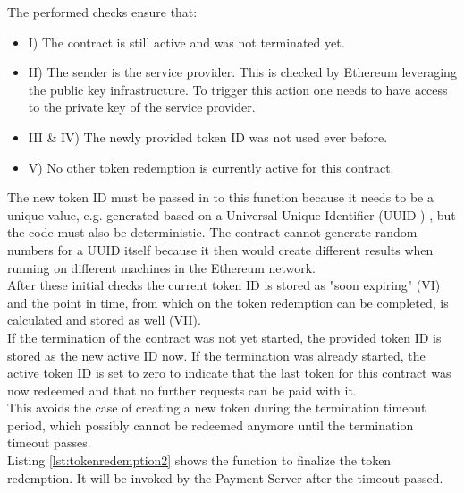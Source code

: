 \documentclass[a4paper,12pt]{scrartcl}
\begin{document}
The performed checks ensure that:
\begin{itemize}
\item[] I) The contract is still active and was not terminated yet.
\item[] II) The sender is the service provider. This is checked by Ethereum leveraging the public key infrastructure. To trigger this action one needs to have access to the private key of the service provider.
\item[] III \& IV) The newly provided token ID was not used ever before.
\item[] V) No other token redemption is currently active for this contract.
\end{itemize}

The new token ID must be passed in to this function because it needs to be a unique value, e.g. generated based on a Universal Unique Identifier (UUID ) \cite{web53}, but the code must also be deterministic. The contract cannot generate random numbers for a UUID itself because it then would create different results when running on different machines in the Ethereum network.\\

After these initial checks the current token ID is stored as "soon expiring" (VI) and the point in time, from which on the token redemption can be completed, is calculated and stored as well (VII).\\

If the termination of the contract was not yet started, the provided token ID is stored as the new active ID now. If the termination was already started, the active token ID is set to zero to indicate that the last token for this contract was now redeemed and that no further requests can be paid with it.\\
This avoids the case of creating a new token during the termination timeout period, which possibly cannot be redeemed anymore until the termination timeout passes.\\

Listing \ref{lst:tokenredemption2} shows the function to finalize the token redemption. It will be invoked by the Payment Server after the timeout passed.\\
\end{document}

